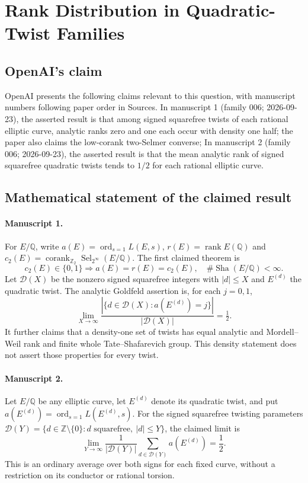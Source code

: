 \documentclass[11pt]{article}
\begin{document}
\section*{Rank Distribution in Quadratic-Twist Families}

\subsection{OpenAI's claim}
OpenAI presents the following claims relevant to this question, with manuscript numbers following paper order in Sources. In manuscript 1 (family 006; 2026-09-23), the asserted result is that among signed squarefree twists of each rational elliptic curve, analytic ranks zero and one each occur with density one half; the paper also claims the low-corank two-Selmer converse; In manuscript 2 (family 006; 2026-09-23), the asserted result is that the mean analytic rank of signed squarefree quadratic twists tends to $1/2$ for each rational elliptic curve.

\subsection{Mathematical statement of the claimed result}
\paragraph{Manuscript 1.}
For $E/\mathbb Q$, write $a(E)=\operatorname{ord}_{s=1}L(E,s)$, $r(E)=\operatorname{rank}E(\mathbb Q)$ and $c_2(E)=\operatorname{corank}_{\mathbb Z_2}\operatorname{Sel}_{2^{\infty}}(E/\mathbb Q)$. The first claimed theorem is
\[
 c_2(E)\in\{0,1\}\Rightarrow a(E)=r(E)=c_2(E),\quad\#\operatorname{Sha}(E/\mathbb Q)<\infty.
\]
Let $\mathcal D(X)$ be the nonzero signed squarefree integers with $|d|\le X$ and $E^{(d)}$ the quadratic twist. The analytic Goldfeld assertion is, for each $j=0,1$,
\[
 \lim_{X\to\infty}\frac{|\{d\in\mathcal D(X):a(E^{(d)})=j\}|}{|\mathcal D(X)|}=\tfrac12.
\]
It further claims that a density-one set of twists has equal analytic and Mordell--Weil rank and finite whole Tate--Shafarevich group. This density statement does not assert those properties for every twist.

\paragraph{Manuscript 2.}
Let $E/\mathbb Q$ be any elliptic curve, let $E^{(d)}$ denote its quadratic twist, and put $a(E^{(d)})=\operatorname{ord}_{s=1}L(E^{(d)},s)$. For the signed squarefree twisting parameters $\mathcal D(Y)=\{d\in\mathbb Z\setminus\{0\}:d\text{ squarefree},\ |d|\le Y\}$, the claimed limit is
\[
 \lim_{Y\to\infty}\frac1{|\mathcal D(Y)|}
       \sum_{d\in\mathcal D(Y)}a(E^{(d)})=\frac12.
\]
This is an ordinary average over both signs for each fixed curve, without a restriction on its conductor or rational torsion.
\end{document}
